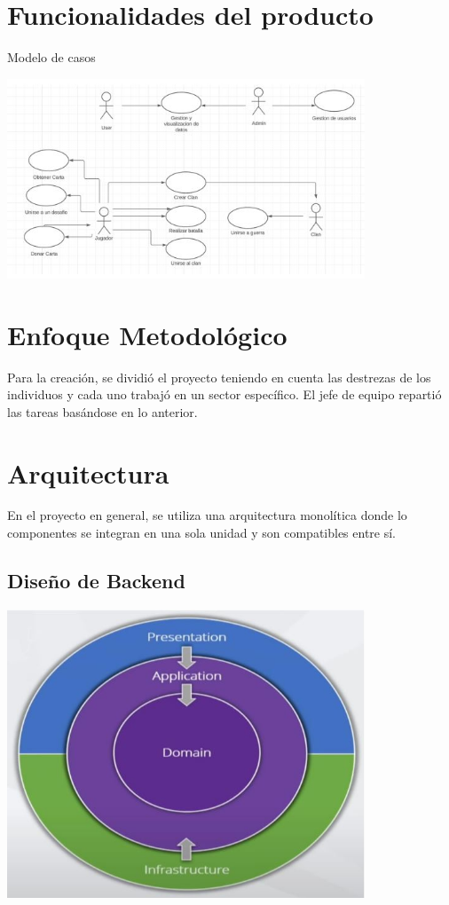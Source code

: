 \documentclass[15pt,a4paper]{article}
\begin{document}
\section{Funcionalidades del producto}
Modelo de casos


\begin{center}
\includegraphics[width=0.8\textwidth]{casos}
\end{center}

\section{Enfoque Metodológico}
Para la creación, se dividió el proyecto teniendo en cuenta las destrezas de los individuos 
y cada uno trabajó en un sector específico. El jefe de equipo repartió las tareas basándose 
en lo anterior. 

\section{Arquitectura}
En el proyecto en general, se utiliza una arquitectura monolítica donde lo componentes 
se integran en una sola unidad y son compatibles entre sí.

\subsection*{Diseño de Backend}
\begin{center}
\includegraphics[width=0.8\textwidth]{back}
\end{center}
\end{document}
